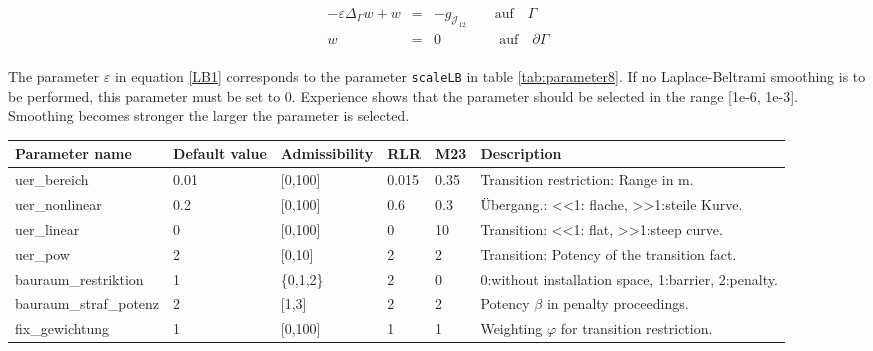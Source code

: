 \documentclass[oneside]{article}
\numberwithin{equation}{section}
\numberwithin{figure}{section}
\newcommand{\JJ }{ \mathcal{J}}
\numberwithin{figure}{section}
\begin{document}
$ $\\
\begin{eqnarray}
\label{LB1} -\varepsilon \Delta_\Gamma w + w &=& -g_{\JJ_{12}}  \qquad \mbox{auf}\quad \Gamma\\
w &=& 0 \qquad \qquad \, \mbox{auf}\quad \partial \Gamma
\end{eqnarray}
$ $\\
The parameter $\varepsilon$ in equation \eqref{LB1} corresponds to the parameter \texttt{scaleLB} in table \ref{tab:parameter8}. If no Laplace-Beltrami smoothing is to be performed, this parameter must be set to 0. Experience shows that the parameter should be selected in the range [1e-6, 1e-3]. Smoothing becomes stronger the larger the parameter is selected.

\begin{table}[h]
    \centering
    \begin{tabular}{|l|p{1cm}|p{1.2cm}|p{0.7cm}|p{0.7cm}|p{5.7cm}|} %
        \hline
        \cellcolor{light-gray} Parameter name & \cellcolor{light-gray} Default value & \cellcolor{light-gray} Admissibility & \cellcolor{light-gray} RLR & \cellcolor{light-gray} M23 & \cellcolor{light-gray} Description \\
        \hline
        uer\_bereich                   &  0.01  &  [0,100]   & 0.015 & 0.35 & Transition restriction: Range in m.\\
        \hline
        uer\_nonlinear                 &  0.2   &  [0,100]   & 0.6   & 0.3 & Übergang.: <<1: flache, >>1:steile Kurve.\\
        \hline
        uer\_linear                    &   0    &  [0,100]   & 0     & 10 & Transition: <<1: flat, >>1:steep curve.\\
        \hline
        uer\_pow                       &  2     &  [0,10]    & 2     & 2 & Transition: Potency of the transition fact.\\
        \hline
        bauraum\_restriktion           &  1     &  \{0,1,2\} &  2    & 0 & 0:without installation space, 1:barrier, 2:penalty.\\
        \hline
        bauraum\_straf\_potenz        &  2     &  [1,3]     &  2    & 2 & Potency $\beta$ in penalty proceedings.\\
        \hline
        fix\_gewichtung                &  1     &  [0,100]   &  1    & 1 & Weighting $\varphi$ for transition restriction.\\

\end{tabular}
\end{table}
\end{document}
